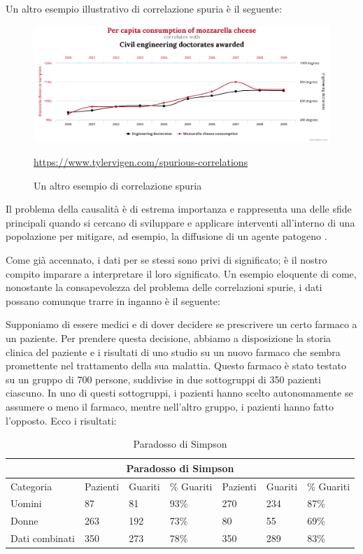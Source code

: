 Un altro esempio illustrativo di correlazione spuria è il seguente:

\begin{figure}[h]
    \begin{center}
        \includegraphics[width=\linewidth]{img/chart1.png}
        \caption{Un altro esempio di correlazione spuria}
        \url{https://www.tylervigen.com/spurious-correlations}
        \label{fig:another_spurious_relations}
    \end{center}
\end{figure}

Il problema della causalità è di estrema importanza e rappresenta 
una delle sfide principali quando si cercano di sviluppare e 
applicare interventi all'interno di una popolazione per mitigare, 
ad esempio, la diffusione di un agente patogeno \cite{Parascandola2001-kw}.

Come già accennato, i dati per se stessi sono privi di significato; 
è il nostro compito imparare a interpretare il loro significato. 
Un esempio eloquente di come, nonostante la consapevolezza del problema 
delle correlazioni spurie, i dati possano comunque trarre in inganno 
è il seguente:

Supponiamo di essere medici e di dover decidere se prescrivere un 
certo farmaco a un paziente. Per prendere questa decisione, abbiamo 
a disposizione la storia clinica del paziente e i risultati di uno 
studio su un nuovo farmaco che sembra promettente nel trattamento 
della sua malattia. Questo farmaco è stato testato su un gruppo di 
700 persone, suddivise in due sottogruppi di 350 pazienti ciascuno. 
In uno di questi sottogruppi, i pazienti hanno scelto autonomamente se 
assumere o meno il farmaco, mentre nell'altro gruppo, i pazienti hanno 
fatto l'opposto. Ecco i risultati:

\begin{table}[htb]
    \centering
    \caption{Paradosso di Simpson}
    \begin{tabular}{ |p{2.2cm}||p{1.6cm}|p{1.6cm}|p{1.6cm}||p{1.6cm}|p{1.6cm}|p{1.6cm}| }
        \hline
        \multicolumn{7}{|c|}{Paradosso di Simpson} \\
        \hline
        Categoria & Pazienti & Guariti & \% Guariti & Pazienti & Guariti & \% Guariti\\
        \hline
        Uomini & 87 & 81 & 93\% & 270 & 234 & 87\% \\
        Donne & 263 & 192 & 73\% & 80 & 55 & 69\% \\
        Dati combinati & 350 & 273 & 78\% & 350 & 289 & 83\% \\
        \hline
    \end{tabular}
\end{table}

